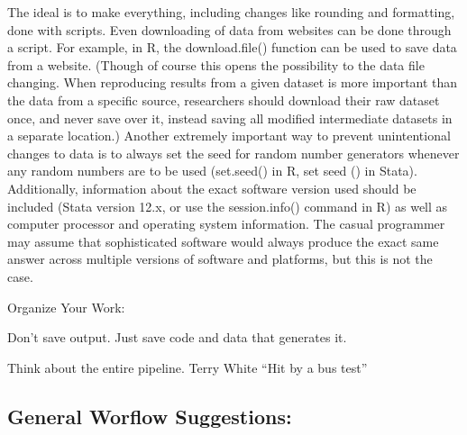 \documentclass[12pt] {article}
\begin{document}
The ideal is to make everything, including changes like rounding and
formatting, done with scripts. Even downloading of data from websites
can be done through a script. For example, in R, the download.file()
function can be used to save data from a website. (Though of course this
opens the possibility to the data file changing. When reproducing
results from a given dataset is more important than the data from a
specific source, researchers should download their raw dataset once, and
never save over it, instead saving all modified intermediate datasets in
a separate location.) Another extremely important way to prevent
unintentional changes to data is to always set the seed for random
number generators whenever any random numbers are to be used (set.seed()
in R, set seed () in Stata). Additionally, information about the exact
software version used should be included (Stata version 12.x, or use the
session.info() command in R) as well as computer processor and operating
system information. The casual programmer may assume that sophisticated
software would always produce the exact same answer across multiple
versions of software and platforms, but this is not the case.

Organize Your Work:

Don't save output. Just save code and data that generates it.

Think about the entire pipeline. Terry White ``Hit by a bus test''

\subsection{General Worflow
Suggestions:}\label{general-worflow-suggestions}
\end{document}
